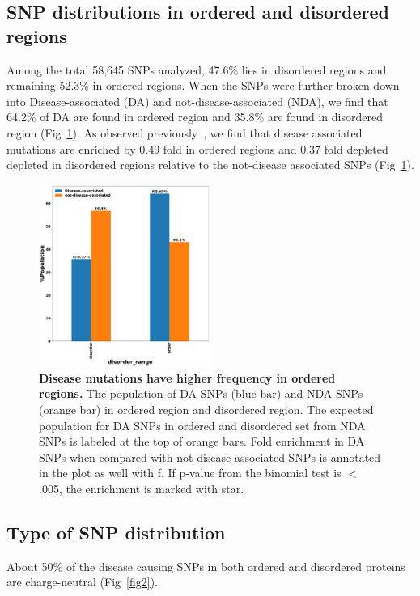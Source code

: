 \documentclass[10pt,letterpaper]{article}
\begin{document}
\subsection*{SNP distributions in ordered and disordered regions}
Among the total 58,645 SNPs analyzed, 47.6\% lies in disordered regions and remaining 52.3\% in ordered regions. When the SNPs were further broken down into Disease-associated (DA) and not-disease-associated (NDA), we find that 64.2\% of DA are found in ordered region and 35.8\% are found in disordered region (Fig~\ref{fig1}). As observed previously~\cite{Vacic2012a}, we find that disease associated mutations are enriched by 0.49 fold in ordered regions and 0.37 fold depleted depleted in disordered regions relative to the not-disease associated SNPs (Fig~\ref{fig1}). 

\begin{figure}[!ht]
\includegraphics[scale=0.1,width=0.5\textwidth,trim={0 0cm 0 0cm},clip]{./figures/order_vs_disorder_SNP.pdf}
\caption{{\bf Disease mutations have higher frequency in ordered regions.} The population of DA SNPs (blue bar) and NDA SNPs (orange bar) in ordered region and disordered region. The expected population for DA SNPs in ordered and disordered set from NDA SNPs is labeled at the top of orange bars. Fold enrichment in DA SNPs when compared with not-disease-associated SNPs is annotated in the plot as well with f. If p-value from the binomial test is $<$ .005, the enrichment is marked with star. }
\label{fig1} 
\end{figure}


\subsection*{Type of SNP distribution}
 About 50\% of the disease causing SNPs in both ordered and disordered proteins are charge-neutral (Fig~\ref{fig2}).  
\end{document}
